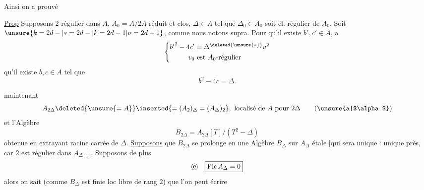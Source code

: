 Ainsi on a prouvé

\uline{Prop} Supposons $2$ régulier dans $A$, $A_0=A/2A$ réduit et  clos, $\Delta\in A$ tel que $\Delta_0\in A_0$ soit él. régulier de $A_0$. Soit $\unsure{k=2d-|*=2d-|k=2d-1|\nu=2d+1}$, comme nous notons supra. Pour qu'il existe $b',c'\in A$,   a
\[
\left\{\begin{aligned}
{b'}^2-4c'&=\Delta^{\deleted{\unsure{*}}}v^2\\
v_0&\text{ est $A_0$-régulier}
\end{aligned}\right.
\]
 qu'il existe $b,c\in A$ tel que
\[
 b^2-4c=\Delta.
\]

 maintenant 
\[
 A_{2\Delta}\deleted{\unsure{=A}}\inserted{=(A_2)_\Delta=(A_\Delta)_2},\ \text{localisé de $A$ pour $2\Delta$} \tag*{(\unsure{a|$\alpha$})}
\]
et l'Algèbre
\[
 B_{2\Delta}=A_{2\Delta}[T]/(T^2-\Delta)
\]
obtenue en extrayant  racine carrée de $\Delta$.  \uline{Supposons} que $B_{2\Delta}$ se prolonge en une Algèbre $B_\Delta$ sur $A_\Delta$  étale  [qui sera unique :  unique près, car $2$ est régulier dans $A_\Delta\ldots$]. Supposons de plus 
\[
 \text{\textcircled{e}}\quad \boxed{\operatorname{Pic} A_\Delta=0}
\]
alors on sait (comme $B_\Delta$ est finie loc libre de rang $2$) que l'on peut écrire

